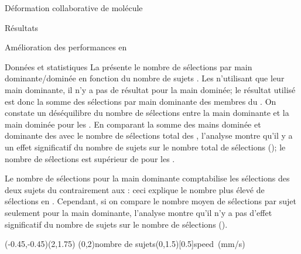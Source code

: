 \documentclass[myfrancais,ngerman,english,french]{mythesis}
\begin{document}
\begin{mychapter}{Déformation collaborative de molécule}
\begin{mysection}{Résultats}
\begin{mysubsection}{Amélioration des performances en }
\begin{mysubsubsection}{Données et statistiques}
					La  présente le nombre de sélections par main dominante/dominée  en fonction du nombre de sujets .
					Les  n'utilisant que leur main dominante, il n'y a pas de résultat pour la main dominée; le résultat utilisé est donc la somme des sélections par main dominante des membres du .
					On constate un déséquilibre du nombre de sélections entre la main dominante et la main dominée pour les .
					En comparant la somme des mains dominée et dominante des  avec le nombre de sélections total des , l'analyse montre qu'il y a un effet significatif du nombre de sujets  sur le nombre total de sélections  (); le nombre de sélections est supérieur de  pour les .

					Le nombre de sélections pour la main dominante comptabilise les sélections des deux sujets du  contrairement aux  : ceci explique le nombre plus élevé de sélections en .
					Cependant, si on compare le nombre moyen de sélections par sujet seulement pour la main dominante, l'analyse montre qu'il n'y a pas d'effet significatif du nombre de sujets  sur le nombre de sélections  ().

					\begin{myfigure}
						\begin{myps}(-0.45,-0.45)(2,1.75)
							\myaxes(0,2){nombre de sujets}(0,1.5)[0.5]{speed~(mm/s)}
						\end{myps}
					\end{myfigure}


\end{mysubsubsection}
\end{mysubsection}
\end{mysection}
\end{mychapter}
\end{document}
